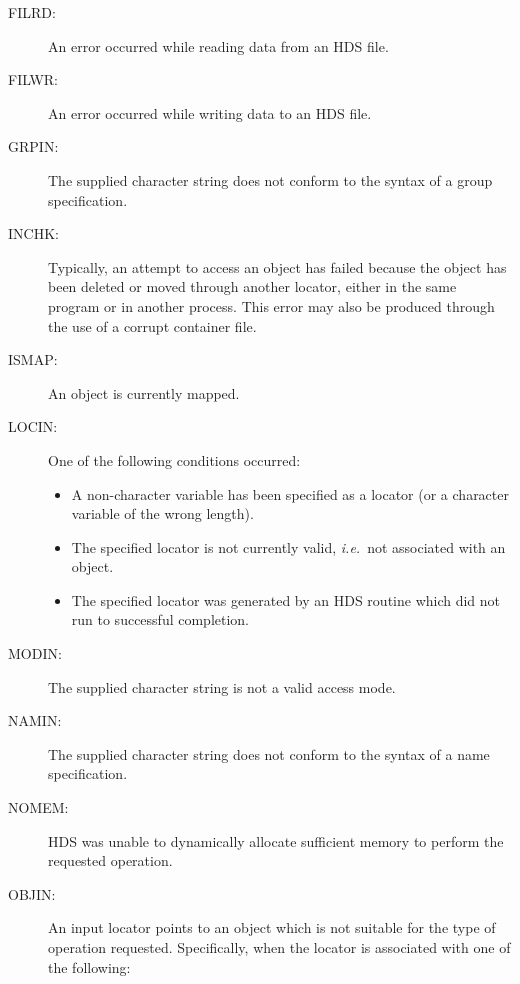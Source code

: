 \begin{description}
\item [FILRD:]
An error occurred while reading data from an HDS file.

\item [FILWR:]
An error occurred while writing data to an HDS file.

\item [GRPIN:]
The supplied character string does not conform to the syntax of a group
specification.

\item [INCHK:]
Typically, an attempt to access an object has failed because the object has
been deleted or moved through another locator, either in the same program or in
another process. This error may also be produced through the use of a corrupt
container file.

\item [ISMAP:]
An object is currently mapped.

\item [LOCIN:]
One of the following conditions occurred:

\begin{itemize}
\item A non-character variable has been specified as a locator (or a character
variable of the wrong length).

\item The specified locator is not currently valid, {\em i.e.}\ not associated
with an object.

\item The specified locator was generated by an HDS routine which did not run
to successful completion.

\end{itemize}

\item [MODIN:]
The supplied character string is not a valid access mode.

\item [NAMIN:]
The supplied character string does not conform to the syntax of a name
specification.

\item [NOMEM:]
HDS was unable to dynamically allocate sufficient memory to perform the
requested operation.

\item [OBJIN:]
An input locator points to an object which is not suitable for the type of
operation requested. Specifically, when the locator is associated with one of
the following:

\begin{itemize}


\end{itemize}
\end{description}

